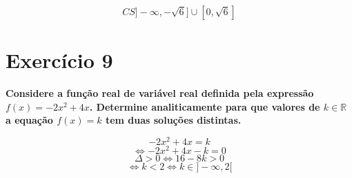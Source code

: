 \documentclass[a4paper]{article}
\begin{document}
	\[CS]-\infty,-\sqrt{6}]\cup [0,\sqrt{6}]\]
	\section*{Exercício 9} \textbf{Considere a função real de variável real definida pela expressão $f(x) = -2x^2 + 4x$. Determine analiticamente para que valores de $k \in \mathbb{R}$ a equação $f(x) = k$ tem duas soluções distintas.}
	
	\[-2x^2+4x=k\]
	\[\Leftrightarrow -2x^2+4x-k=0\]
	\[\Delta>0 \Leftrightarrow 16-8k>0\]
	\[\Leftrightarrow k < 2\Leftrightarrow k \in ]-\infty,2[\]
	

	
\end{document}
